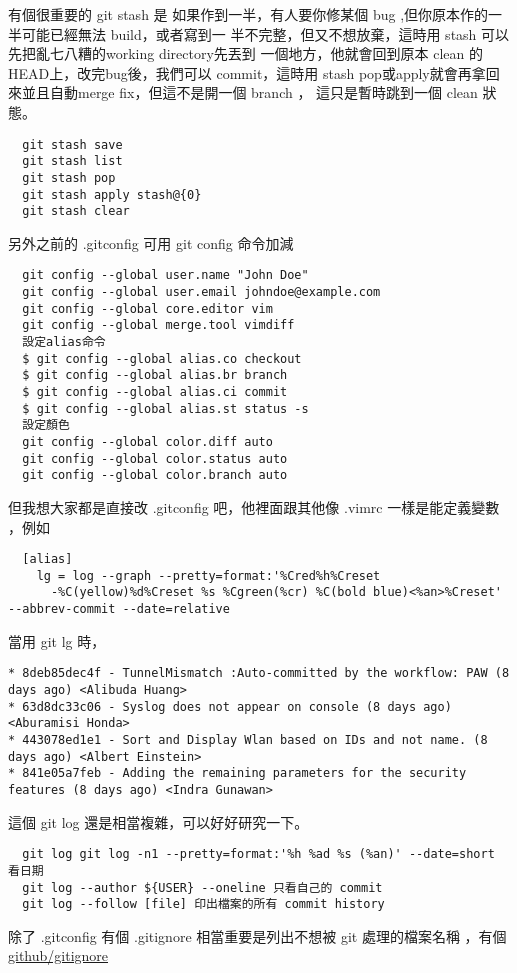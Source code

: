   有個很重要的 git stash 是
  如果作到一半，有人要你修某個 bug ,但你原本作的一半可能已經無法 build，或者寫到一
  半不完整，但又不想放棄，這時用 stash 可以先把亂七八糟的working directory先丟到
  一個地方，他就會回到原本 clean 的 HEAD上，改完bug後，我們可以 commit，這時用
  stash pop或apply就會再拿回來並且自動merge fix，但這不是開一個 branch ，
  這只是暫時跳到一個 clean 狀態。
  \begin{verbatim}
  git stash save
  git stash list
  git stash pop
  git stash apply stash@{0}
  git stash clear
  \end{verbatim}
  另外之前的 .gitconfig 可用 git config 命令加減
  \begin{verbatim}
  git config --global user.name "John Doe"
  git config --global user.email johndoe@example.com
  git config --global core.editor vim
  git config --global merge.tool vimdiff
  設定alias命令
  $ git config --global alias.co checkout
  $ git config --global alias.br branch
  $ git config --global alias.ci commit
  $ git config --global alias.st status -s
  設定顏色
  git config --global color.diff auto
  git config --global color.status auto
  git config --global color.branch auto
  \end{verbatim}
  但我想大家都是直接改 .gitconfig 吧，他裡面跟其他像 .vimrc 一樣是能定義變數
  ，例如
  {\scriptsize
  \begin{verbatim}
  [alias]
    lg = log --graph --pretty=format:'%Cred%h%Creset 
      -%C(yellow)%d%Creset %s %Cgreen(%cr) %C(bold blue)<%an>%Creset' --abbrev-commit --date=relative
  \end{verbatim}}
  當用 git lg 時，
  {\scriptsize
  \begin{verbatim}
* 8deb85dec4f - TunnelMismatch :Auto-committed by the workflow: PAW (8 days ago) <Alibuda Huang>
* 63d8dc33c06 - Syslog does not appear on console (8 days ago) <Aburamisi Honda>
* 443078ed1e1 - Sort and Display Wlan based on IDs and not name. (8 days ago) <Albert Einstein>
* 841e05a7feb - Adding the remaining parameters for the security features (8 days ago) <Indra Gunawan>
  \end{verbatim}}
  這個 git log 還是相當複雜，可以好好研究一下。
  \begin{verbatim}
  git log git log -n1 --pretty=format:'%h %ad %s (%an)' --date=short 看日期
  git log --author ${USER} --oneline 只看自己的 commit
  git log --follow [file] 印出檔案的所有 commit history
  \end{verbatim}
  除了 .gitconfig 有個 .gitignore 相當重要是列出不想被 git 處理的檔案名稱
  ，有個\href{https://github.com/github/gitignore}{github/gitignore}
